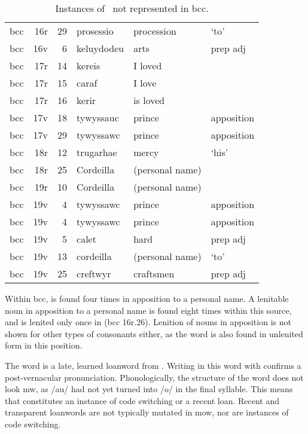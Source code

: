 \begin{table}[h]
  \centering
  \caption{Instances of \lT\ not represented in \acrshort{bcc}.}
  \label{tab:ltnotrepbcc}
  \begin{tabular}{lddwql}
    \toprule
     &  &  &  &  &  \\
    \midrule
    \gls{bcc} & 16r & 29 & prosessio & procession &  ‘to' \\
    \gls{bcc} & 16v & 6 & keluydodeu & arts & prep adj \\
    \gls{bcc} & 17r & 14 & kereis & I loved &  \\
    \gls{bcc} & 17r & 15 & caraf & I love &  \\
    \gls{bcc} & 17r & 16 & kerir & is loved &  \\
    \gls{bcc} & 17v & 18 & tywyssauc & prince & apposition \\
    \gls{bcc} & 17v & 29 & tywyssawc & prince & apposition \\
    \gls{bcc} & 18r & 12 & trugarhae & mercy &  ‘his' \\
    \gls{bcc} & 18r & 25 & Cordeilla & (personal name) &  \\
    \gls{bcc} & 19r & 10 & Cordeilla & (personal name) &  \\
    \gls{bcc} & 19v & 4 & tywyssawc & prince & apposition \\
    \gls{bcc} & 19v & 4 & tywyssawc & prince & apposition \\
    \gls{bcc} & 19v & 5 & calet & hard & prep adj \\
    \gls{bcc} & 19v & 13 & cordeilla & (personal name) &  ‘to' \\
    \gls{bcc} & 19v & 25 & creftwyr & craftsmen & prep adj \\
    \bottomrule
  \end{tabular}%
\end{table}

Within \gls{bcc},  is found four times in apposition to a personal name.
A lenitable noun in apposition to a personal name is found eight times within this source, and is lenited only once in  (\gls{bcc} 16r.26).
Lenition of nouns in apposition is not shown for other types of consonants either, as the word  is also found in unlenited form in this position.

The word  is a late, learned loanword from .
Writing  in this word with  confirms a post-vernacular pronunciation.
Phonologically, the structure of the word does not look \gls{mw}, as /au/ had not yet turned into /o/ in the final syllable.
This means that  constitutes an instance of code switching or a recent loan.
Recent and transparent loanwords are not typically mutated in \gls{mow}, nor are instances of code switching.

